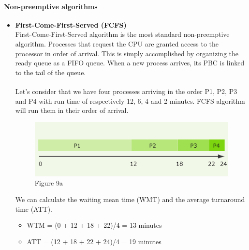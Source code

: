 \documentclass[11pt,a4paper]{scrreprt}
\begin{document}
\paragraph{Non-preemptive algorithms}
\begin{itemize}
\item \textbf{First-Come-First-Served (FCFS)} \\
First-Come-First-Served algorithm is the most standard non-preemptive algorithm. Processes that request the CPU are granted access to the processor in order of arrival. This is simply accomplished by organizing the ready queue as a FIFO queue. When a new process arrives, its PBC is linked to the tail of the queue. \\\\
Let's consider that we have four processes arriving in the order P1, P2, P3 and P4 with run time of respectively 12, 6, 4 and 2 minutes. FCFS algorithm will run them in their order of arrival.
\begin{figure}[!ht]
\centering
\includegraphics[width=0.7\linewidth]{img/Fig9a.png}
\caption{Figure 9a}
\label{fig:figure9a}
\end{figure}
We can calculate the waiting mean time (WMT) and the average turnaround time (ATT).
\begin{itemize}
\item WTM = (0 + 12 + 18 + 22)/4 = 13 minutes
\item ATT = (12 + 18 + 22 + 24)/4 = 19 minutes
\end{itemize}


\end{itemize}
\end{document}
